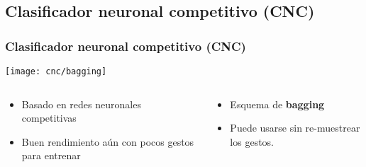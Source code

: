 



  
\subsection{Clasificador neuronal competitivo (CNC)}

\begin{frame}
\frametitle{Clasificador neuronal competitivo (CNC)}

    \texttt{[image: cnc/bagging]}
\begin{columns}
    \begin{column}{0.5\textwidth}
      \begin{itemize}
        \item Basado en redes neuronales competitivas
        \item Buen rendimiento aún con pocos gestos para entrenar
      \end{itemize}
    \end{column}
    \begin{column}{0.5\textwidth}
          \begin{itemize}
            \item Esquema de \textbf{bagging}
            \item Puede usarse sin re-muestrear los gestos.
          \end{itemize}
    \end{column}
  \end{columns}
\end{frame}




